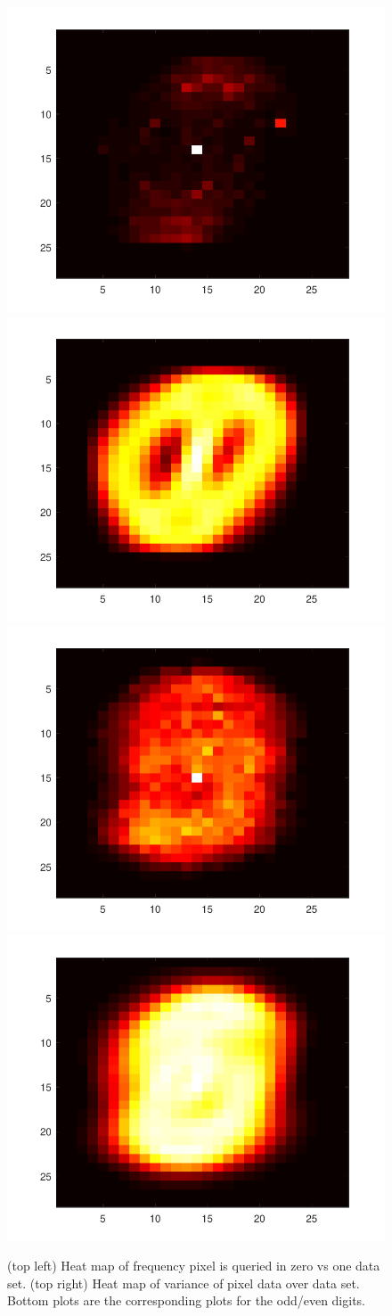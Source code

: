 \documentclass[twoside]{article}
\begin{document}
\begin{figure}
\centering
\includegraphics[width=0.49\columnwidth]{expHM.pdf}
\includegraphics[width=0.49\columnwidth]{01HM.pdf}
\includegraphics[width=0.49\columnwidth]{OEexpHM.pdf}
\includegraphics[width=0.49\columnwidth]{OEHM.pdf}
\caption{(top left) Heat map of frequency pixel is queried in zero vs one data set.  (top right) Heat map of variance of pixel data over data set.
Bottom plots are the corresponding plots for the odd/even digits.}\label{fig:HM}
\end{figure}
\end{document}
